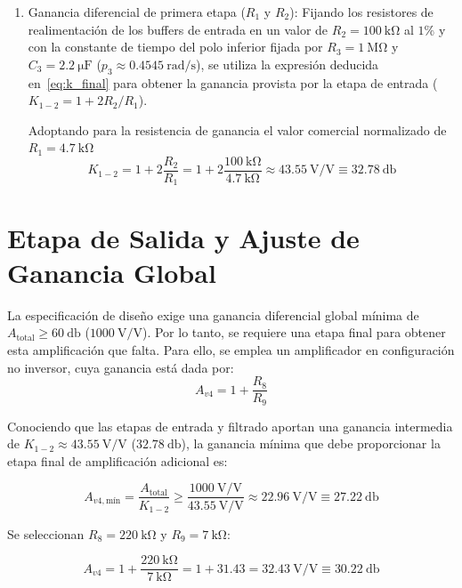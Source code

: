 \begin{enumerate}
  \item Ganancia diferencial de primera etapa ($R_1$ y $R_2$): Fijando los resistores de realimentación de los buffers de entrada en un valor
        de $R_2 = \SI{100}{\kilo\ohm}$ al $1\%$ y con la constante de tiempo del
        polo inferior fijada por $R_3 = \SI{1}{\mega\ohm}$ y $C_3 =
        \SI{2.2}{\micro\farad}$ ($p_3 \approx \SI{0.4545}{\radian/\second}$), se
        utiliza la expresión deducida en~\eqref{eq:k_final} para obtener la
        ganancia provista por la etapa de entrada
        ($K_{1-2} = 1 + 2 R_2/R_1$).

  Adoptando para la resistencia de ganancia el valor comercial normalizado de $R_1 = \SI{4.7}{\kilo\ohm}$
  \begin{equation*}
    K_{1-2} = 1 + 2 \frac{R_2}{R_1} = 1 + 2 \frac{\SI{100}{\kilo\ohm}}{\SI{4.7}{\kilo\ohm}} \approx 43.55\ \text{V/V} \equiv \SI{32.78}{\decibel}
  \end{equation*}
\end{enumerate}

\section{Etapa de Salida y Ajuste de Ganancia Global}

La especificación de diseño exige una ganancia diferencial global mínima de
$A_{\text{total}} \ge \SI{60}{\decibel}$ ($1000\ \text{V/V}$). Por lo tanto, se
requiere una etapa final para obtener esta amplificación que falta. Para ello,
se emplea un amplificador en configuración no inversor, cuya ganancia está dada
por:
\begin{equation*}
  A_{v4} = 1 + \frac{R_8}{R_9}
\end{equation*}

Conociendo que las etapas de entrada y filtrado aportan una ganancia intermedia
de $K_{1-2} \approx 43.55\ \text{V/V}$ ($\SI{32.78}{\decibel}$), la ganancia
mínima que debe proporcionar la etapa final de amplificación adicional es:

\begin{equation*}
  A_{v4,\text{mín}} = \frac{A_{\text{total}}}{K_{1-2}} \ge \frac{1000\ \text{V/V}}{43.55\ \text{V/V}} \approx 22.96\ \text{V/V} \equiv \SI{27.22}{\decibel}
\end{equation*}

Se seleccionan $R_8 = \SI{220}{\kilo\ohm}$ y $R_9 = \SI{7}{\kilo\ohm}$:

\begin{equation*}
  A_{v4} = 1 + \frac{\SI{220}{\kilo\ohm}}{\SI{7}{\kilo\ohm}} = 1 + 31.43 = 32.43\ \text{V/V} \equiv \SI{30.22}{\decibel}
\end{equation*}

